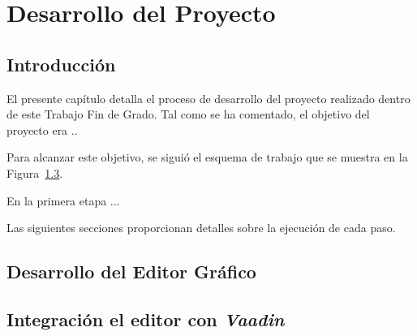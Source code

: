 \chapter{Desarrollo del Proyecto}

\minitoc

\section{Introducción}


El presente capítulo detalla el proceso de desarrollo del proyecto realizado dentro de este Trabajo Fin de Grado. Tal como se ha comentado, el objetivo del proyecto era .. 

Para alcanzar este objetivo, se siguió el esquema de trabajo que se muestra en la Figura~\ref{}.  

En la primera etapa ...

Las siguientes secciones proporcionan detalles sobre la ejecución de cada paso.

\section{Desarrollo del Editor Gráfico}






\section{Integración el editor con \emph{Vaadin}}






